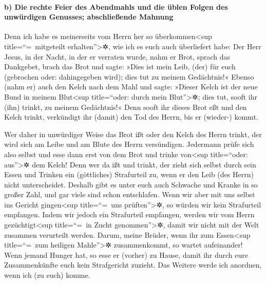 \hypertarget{b-die-rechte-feier-des-abendmahls-und-die-uxfcblen-folgen-des-unwuxfcrdigen-genusses-abschlieuxdfende-mahnung}{%
\paragraph{b) Die rechte Feier des Abendmahls und die üblen Folgen des
unwürdigen Genusses; abschließende
Mahnung}\label{b-die-rechte-feier-des-abendmahls-und-die-uxfcblen-folgen-des-unwuxfcrdigen-genusses-abschlieuxdfende-mahnung}}

 Denn ich habe es meinerseits vom Herrn her so
überkommen\textless sup title=``=~mitgeteilt erhalten''\textgreater✲,
wie ich es euch auch überliefert habe: Der Herr Jesus, in der Nacht, in
der er verraten wurde, nahm er Brot,  sprach das
Dankgebet, brach das Brot und sagte: »Dies ist mein Leib, (der) für euch
(gebrochen oder: dahingegeben wird); dies tut zu meinem Gedächtnis!«
 Ebenso (nahm er) auch den Kelch nach dem Mahl und sagte:
»Dieser Kelch ist der neue Bund in meinem Blut\textless sup
title=``oder: durch mein Blut''\textgreater✲; dies tut, sooft ihr (ihn)
trinkt, zu meinem Gedächtnis!«  Denn sooft ihr dieses
Brot eßt und den Kelch trinkt, verkündigt ihr (damit) den Tod des Herrn,
bis er (wieder-) kommt.

 Wer daher in unwürdiger Weise das Brot ißt oder den
Kelch des Herrn trinkt, der wird sich am Leibe und am Blute des Herrn
versündigen.  Jedermann prüfe sich also selbst und esse
dann erst von dem Brot und trinke von\textless sup title=``oder:
aus''\textgreater✲ dem Kelch!  Denn wer da ißt und
trinkt, der zieht sich selbst durch sein Essen und Trinken ein
(göttliches) Strafurteil zu, wenn er den Leib (des Herrn) nicht
unterscheidet.  Deshalb gibt es unter euch auch Schwache
und Kranke in so großer Zahl, und gar viele sind schon entschlafen.
 Wenn wir aber mit uns selbst ins Gericht
gingen\textless sup title=``=~uns prüften''\textgreater✲, so würden wir
kein Strafurteil empfangen.  Indem wir jedoch ein
Strafurteil empfangen, werden wir vom Herrn gezüchtigt\textless sup
title=``=~in Zucht genommen''\textgreater✲, damit wir nicht mit der Welt
zusammen verurteilt werden.  Darum, meine Brüder, wenn
ihr zum Essen\textless sup title=``=~zum heiligen Mahle''\textgreater✲
zusammenkommt, so wartet aufeinander!  Wenn jemand Hunger
hat, so esse er (vorher) zu Hause, damit ihr durch eure Zusammenkünfte
euch kein Strafgericht zuzieht. Das Weitere werde ich anordnen, wenn ich
(zu euch) komme.

